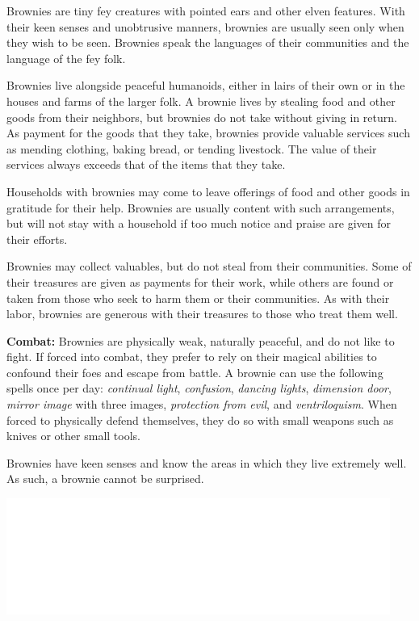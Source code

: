 \begin{multicols}{2}
\begin{minipage}{\columnwidth}
\end{minipage}

Brownies are tiny fey creatures with pointed ears and other elven features. With their keen senses and unobtrusive manners, brownies are usually seen only when they wish to be seen. Brownies speak the languages of their communities and the language of the fey folk.

Brownies live alongside peaceful humanoids, either in lairs of their own or in the houses and farms of the larger folk. A brownie lives by stealing food and other goods from their neighbors, but brownies do not take without giving in return. As payment for the goods that they take, brownies provide valuable services such as mending clothing, baking bread, or tending livestock. The value of their services always exceeds that of the items that they take.

Households with brownies may come to leave offerings of food and other goods in gratitude for their help. Brownies are usually content with such arrangements, but will not stay with a household if too much notice and praise are given for their efforts.

Brownies may collect valuables, but do not steal from their communities. Some of their treasures are given as payments for their work, while others are found or taken from those who seek to harm them or their communities. As with their labor, brownies are generous with their treasures to those who treat them well.

\textbf{Combat:} Brownies are physically weak, naturally peaceful, and do not like to fight. If forced into combat, they prefer to rely on their magical abilities to confound their foes and escape from battle. A brownie can use the following spells once per day: \textit{continual light}, \textit{confusion}, \textit{dancing lights}, \textit{dimension door}, \textit{mirror image} with three images, \textit{protection from evil}, and \textit{ventriloquism}. When forced to physically defend themselves, they do so with small weapons such as knives or other small tools.

Brownies have keen senses and know the areas in which they live extremely well. As such, a brownie cannot be surprised.

\noindent\includegraphics[width=\columnwidth, height=1.5in]{testblock.pdf} 


\end{multicols}
